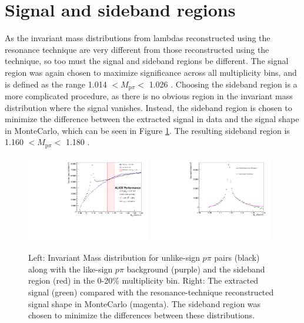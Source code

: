 \section{Signal and sideband regions}
\label{sec:signal_sideband_res}

As the invariant mass distributions from lambdas reconstructed using the resonance technique are very different from those reconstructed using the \vz technique, so too must the signal and sideband regions be different. The signal region was again chosen to maximize significance across all multiplicity bins, and is defined as the range 1.014 $< M_{\text{p}\pi} < $ 1.026 \GeVmass. Choosing the sideband region is a more complicated procedure, as there is no obvious region in the invariant mass distribution where the signal vanishes. Instead, the sideband region is chosen to minimize the difference between the extracted signal in data and the signal shape in MonteCarlo, which can be seen in Figure \ref{fig:res_invariant_mass_0_20}. The resulting sideband region is 1.160 $< M_{\text{p}\pi} < $ 1.180 \GeVmass.

\begin{figure}[ht]
\centering
\includegraphics[width=0.48\textwidth]{figures/analysis/lambda_mass_0_20_resonance_with_ls_with_rsb.pdf}
\includegraphics[width=0.48\textwidth]{figures/analysis/lambda_mass_0_20_resonance_signal_comp.pdf}
\caption{Left: Invariant Mass distribution for unlike-sign $p\pi$ pairs (black) along with the like-sign $p\pi$ background (purple) and the sideband region (red) in the 0-20\% multiplicity bin. Right: The extracted signal (green) compared with the resonance-technique reconstructed signal shape in MonteCarlo (magenta). The sideband region was chosen to minimize the differences between these distributions. }
\label{fig:res_invariant_mass_0_20}
\end{figure}

